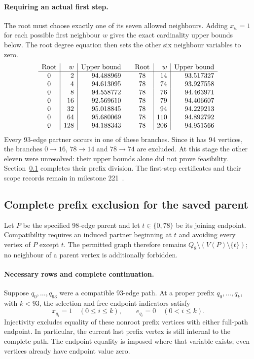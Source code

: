 \documentclass[11pt,a4paper]{article}
\theoremstyle{definition}
\theoremstyle{remark}
\begin{document}
\paragraph{Requiring an actual first step.}
The root must choose exactly one of its seven allowed neighbours.
Adding $x_w=1$ for each possible first neighbour $w$ gives the exact
cardinality upper bounds below. The root degree equation then sets
the other six neighbour variables to zero.
\[
\begin{array}{c|r|r@{\qquad}c|r|r}
\text{Root}&w&\text{Upper bound}&\text{Root}&w&\text{Upper bound}\\\hline
0&2&94.488969&78&14&93.517327\\
0&4&94.613095&78&74&93.927558\\
0&8&94.558772&78&76&94.463971\\
0&16&92.569610&78&79&94.406607\\
0&32&95.018845&78&94&94.229213\\
0&64&95.680069&78&110&94.892792\\
0&128&94.188343&78&206&94.951566
\end{array}
\]
Every 93-edge partner occurs in one of these branches. Since it has
94 vertices, the branches $0\to16$, $78\to14$ and $78\to74$ are excluded.
At this stage the other eleven were unresolved: their upper bounds alone
did not prove feasibility. Section~\ref{sec:prefix222} completes their
prefix division. The first-step certificates and their scope records
remain in milestone 221~\cite{research221}.

\subsection{Complete prefix exclusion for the saved parent}
\label{sec:prefix222}
Let $P$ be the specified 98-edge parent and let $t\in\{0,78\}$ be its
joining endpoint. Compatibility requires an induced partner beginning
at $t$ and avoiding every vertex of $P$ except $t$. The permitted graph
therefore remains $Q_8\setminus(V(P)\setminus\{t\})$; no neighbour of
a parent vertex is additionally forbidden.

\paragraph{Necessary rows and complete continuation.}
Suppose $q_0,\ldots,q_{93}$ were a compatible 93-edge path. At a proper
prefix $q_0,\ldots,q_k$, with $k<93$, the selection and free-endpoint
indicators satisfy
\[
x_{q_i}=1\quad(0\le i\le k),\qquad
e_{q_i}=0\quad(0<i\le k).
\]
Injectivity excludes equality of these nonroot prefix vertices with
either full-path endpoint. In particular, the current last prefix vertex
is still internal to the complete path. The endpoint equality is imposed
where that variable exists; even vertices already have endpoint value zero.
\end{document}
